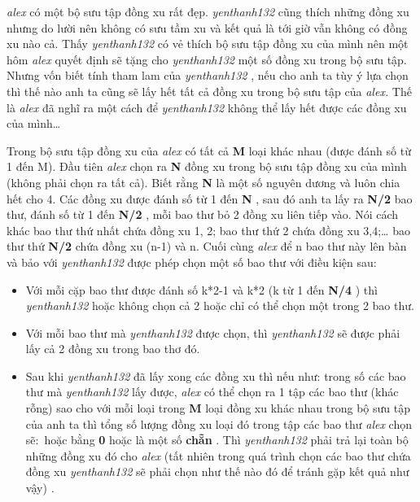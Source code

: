 \emph{    alex   }   có một bộ sưu tập đồng xu rất đẹp.   \emph{    yenthanh132   }   cũng thích những đồng xu nhưng do lười nên không có sưu tầm xu và kết quả là tới giờ vẫn không có đồng xu nào cả. Thấy   \emph{    yenthanh132   }   có vẻ thích bộ sưu tập đồng xu của mình nên một hôm   \emph{    alex   }   quyết định sẽ tặng cho   \emph{    yenthanh132   }   một số đồng xu trong bộ sưu tập. Nhưng vốn biết tính tham lam của   \emph{    yenthanh132   }   , nếu cho anh ta tùy ý lựa chọn thì thế nào anh ta cũng sẽ lấy hết tất cả đồng xu trong bộ sưu tập của   \emph{    alex.   }   Thế là   \emph{    alex   }   đã nghĩ ra một cách để   \emph{    yenthanh132   }   không thể lấy hết được các đồng xu của mình…  

   Trong bộ sưu tập đồng xu của   \emph{    alex   }   có tất cả   \textbf{    M   }   loại khác nhau (được đánh số từ 1 đến M). Đầu tiên   \emph{    alex   }   chọn ra   \textbf{    N   }   đồng xu trong bộ sưu tập đồng xu của mình (không phải chọn ra tất cả). Biết rằng   \textbf{    N   }   là một số nguyên dương và luôn chia hết cho 4. Các đồng xu được đánh số từ 1 đến   \textbf{    N   }   , sau đó anh ta lấy ra   \textbf{    N/2   }   bao thư, đánh số từ 1 đến   \textbf{    N/2   }   , mỗi bao thư bỏ 2 đồng xu liên tiếp vào. Nói cách khác bao thư thứ nhất chứa đồng xu 1, 2; bao thư thứ 2 chứa đồng xu 3,4;… bao thư thứ   \textbf{    N/2   }   chứa đồng xu (n-1) và n. Cuối cùng   \emph{    alex   }   để n bao thư này lên bàn và bảo với   \emph{    yenthanh132   }   được phép chọn một số bao thư với điều kiện sau:  
\begin{itemize}
	\item     Với mỗi cặp bao thư được đánh số k*2-1 và k*2 (k từ 1 đến    \textbf{     N/4    }    ) thì    \emph{     yenthanh132    }    hoặc không chọn cả 2 hoặc chỉ có thể chọn một trong 2 bao thư.   
	\item     Với mỗi bao thư mà    \emph{     yenthanh132    }    được chọn, thì    \emph{     yenthanh132    }    sẽ được phải lấy cả 2 đồng xu trong bao thơ đó.   
	\item     Sau khi    \emph{     yenthanh132    }    đã lấy xong các đồng xu thì nếu như: trong số các bao thư mà    \emph{     yenthanh132    }    lấy được,    \emph{     alex    }    có thể chọn ra 1 tập các bao thư (khác rỗng) sao cho với mỗi loại trong    \textbf{     M    }    loại đồng xu khác nhau trong bộ sưu tập của anh ta thì tổng số lượng đồng xu loại đó trong tập các bao thư    \emph{     alex    }    chọn sẽ: hoặc bằng    \textbf{     0    }    hoặc là một số    \textbf{     chẵn    }    . Thì    \emph{     yenthanh132    }    phải trả lại toàn bộ những đồng xu đó cho    \emph{     alex    }    (tất nhiên trong quá trình chọn các bao thư chứa đồng xu    \emph{     yenthanh132    }    sẽ phải chọn như thế nào đó để tránh gặp kết quả như vậy)    \emph{     .    }
\end{itemize}

